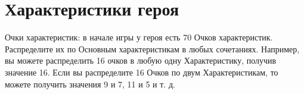 \section{Характеристики героя}
Очки характеристик: в начале игры у героя есть 70 Очков характеристик. Распределите их по Основным характеристикам в любых сочетаниях. Например, вы можете распределить 16 очков в любую одну Характеристику, получив значение 16. Если вы распределите 16 Очков по двум Характеристикам, то можете получить значения 9 и 7, 11 и 5 и т. д.